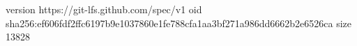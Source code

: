 version https://git-lfs.github.com/spec/v1
oid sha256:ef606fdf2ffc6197b9e1037860e1fe788cfa1aa3bf271a986dd6662b2e6526ca
size 13828
